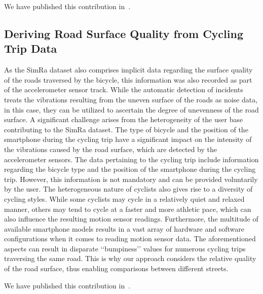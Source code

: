 We have published this contribution in~\cite{karakaya2020simra,karakaya2023cyclesense}.

\subsection{Deriving Road Surface Quality from Cycling Trip Data}
\label{subsec:road_surface_contribution}
As the SimRa dataset also comprises implicit data regarding the surface quality of the roads traversed by the bicycle, this information was also recorded as part of the accelerometer sensor track.
While the automatic detection of incidents treats the vibrations resulting from the uneven surface of the roads as noise data, in this case, they can be utilized to ascertain the degree of unevenness of the road surface.
A significant challenge arises from the heterogeneity of the user base contributing to the SimRa dataset.
The type of bicycle and the position of the smartphone during the cycling trip have a significant impact on the intensity of the vibrations caused by the road surface, which are detected by the accelerometer sensors.
The data pertaining to the cycling trip include information regarding the bicycle type and the position of the smartphone during the cycling trip. However, this information is not mandatory and can be provided voluntarily by the user.
The heterogeneous nature of cyclists also gives rise to a diversity of cycling styles.
While some cyclists may cycle in a relatively quiet and relaxed manner, others may tend to cycle at a faster and more athletic pace, which can also influence the resulting motion sensor readings.
Furthermore, the multitude of available smartphone models results in a vast array of hardware and software configurations when it comes to reading motion sensor data.
The aforementioned aspects can result in disparate ‘‘bumpiness’’ values for numerous cycling trips traversing the same road.
This is why our approach considers the relative quality of the road surface, thus enabling comparisons between different streets.

We have published this contribution in~\cite{karakaya2023crowdsensing}.

